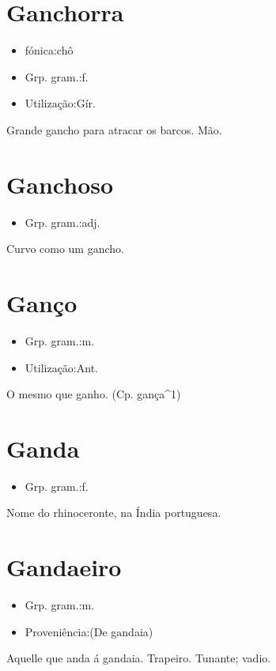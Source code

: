 \section{Ganchorra}
\begin{itemize}
\item {fónica:chô}
\end{itemize}
\begin{itemize}
\item {Grp. gram.:f.}
\end{itemize}
\begin{itemize}
\item {Utilização:Gír.}
\end{itemize}
Grande gancho para atracar os barcos.
Mão.
\section{Ganchoso}
\begin{itemize}
\item {Grp. gram.:adj.}
\end{itemize}
Curvo como um gancho.
\section{Ganço}
\begin{itemize}
\item {Grp. gram.:m.}
\end{itemize}
\begin{itemize}
\item {Utilização:Ant.}
\end{itemize}
O mesmo que \textunderscore ganho\textunderscore .
(Cp. \textunderscore gança\textunderscore ^1)
\section{Ganda}
\begin{itemize}
\item {Grp. gram.:f.}
\end{itemize}
Nome do rhinoceronte, na Índia portuguesa.
\section{Gandaeiro}
\begin{itemize}
\item {Grp. gram.:m.}
\end{itemize}
\begin{itemize}
\item {Proveniência:(De \textunderscore gandaia\textunderscore )}
\end{itemize}
Aquelle que anda á gandaia.
Trapeiro.
Tunante; vadio.
